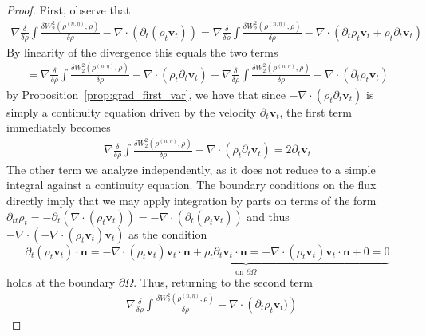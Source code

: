 \documentclass[reqno,11pt,letterpaper]{amsart}
\theoremstyle{plain}
\theoremstyle{definition}
\theoremstyle{remark}
\begin{document}
\begin{proof}
First, observe that
\begin{align*}
\nabla\frac{\delta}{\delta\rho} \int \frac{\delta W_{2}^{2}(\rho^{(n,\eta)}, \rho) }{\delta \rho} - \nabla\cdot\left( \partial_{t} (\rho_{t} \mathbf{v}_{t}  
    ) \right) = \nabla\frac{\delta}{\delta\rho} \int \frac{\delta W_{2}^{2}(\rho^{(n,\eta)}, \rho) }{\delta \rho} - \nabla\cdot\left( \partial_{t} \rho_{t} \mathbf{v}_{t}  + \rho_{t} \partial_{t} \mathbf{v}_{t}
     \right)
\end{align*}
By linearity of the divergence this equals the two terms
\begin{align*}
    = \nabla\frac{\delta}{\delta\rho} \int \frac{\delta W_{2}^{2}(\rho^{(n,\eta)}, \rho) }{\delta \rho} - \nabla\cdot\left( \rho_{t} \partial_{t} \mathbf{v}_{t}
     \right) + \nabla\frac{\delta}{\delta\rho} \int \frac{\delta W_{2}^{2}(\rho^{(n,\eta)}, \rho) }{\delta \rho} - \nabla\cdot\left( \partial_{t} \rho_{t} \mathbf{v}_{t} 
     \right)
\end{align*}
by Proposition~\ref{prop:grad_first_var}, we have that since $- \nabla\cdot\left( \rho_{t} \partial_{t} \mathbf{v}_{t}
     \right)$ is simply a continuity equation driven by the velocity $\partial_{t} \mathbf{v}_{t}$, the first term immediately becomes
\begin{align*}
    \nabla\frac{\delta}{\delta\rho} \int \frac{\delta W_{2}^{2}(\rho^{(n,\eta)}, \rho) }{\delta \rho} - \nabla\cdot\left( \rho_{t} \partial_{t} \mathbf{v}_{t}
     \right) = 2 \partial_{t} \mathbf{v}_{t}
\end{align*}
The other term we analyze independently, as it does not reduce to a simple integral against a continuity equation. The boundary conditions on the flux directly imply that we may apply integration by parts on terms of the form $\partial_{tt} \rho_{t}  = - \partial_{t}( \nabla \cdot (\rho_{t} \mathbf{v}_{t} ))  = -\nabla \cdot (\partial_{t}(\rho_{t} \mathbf{v}_{t}))$ and thus $-\nabla \cdot (-\nabla \cdot\left(\rho_{t} \mathbf{v}_{t}\right) \mathbf{v}_{t} ) $ as the condition
\[
\partial_{t} (\rho_{t} \mathbf{v}_{t}) \cdot \bm{n} = \underbrace{-\nabla \cdot\left(\rho_{t} \mathbf{v}_{t}\right) \mathbf{v}_{t} \cdot \bm{n} + \rho_{t} \partial_{t}\mathbf{v}_{t} \cdot \bm{n} = -\nabla \cdot\left(\rho_{t} \mathbf{v}_{t}\right) \mathbf{v}_{t} \cdot \bm{n} +0 = 0}_{\text{on }\partial \Omega}
\]
holds at the boundary $\partial \Omega$. Thus, returning to the second term
\begin{align*}
    & \nabla\frac{\delta}{\delta\rho} \int \frac{\delta W_{2}^{2}(\rho^{(n,\eta)}, \rho) }{\delta \rho} - \nabla\cdot\left( \partial_{t} \rho_{t} \mathbf{v}_{t}) \right) 

\end{align*}
\end{proof}
\end{document}
